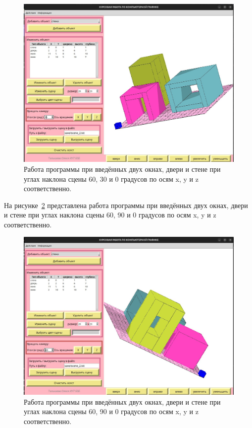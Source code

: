 \begin{figure}[H]
    \centering
    \includegraphics[width=1\textwidth]{img/example_60_30_0.png}
    \caption{Работа программы при введённых двух окнах, двери и стене при углах наклона сцены 60, 30 и 0 градусов по осям x, y и z соответственно.}
    \label{fig:example_60_30_0}
\end{figure}

На рисунке~\ref{fig:example_60_90_0} представлена работа программы при введённых двух окнах, двери и стене при углах наклона сцены 60, 90 и 0 градусов по осям x, y и z соответственно.

\begin{figure}[H]
    \centering
    \includegraphics[width=1\textwidth]{img/example_60_90_0.png}
    \caption{Работа программы при введённых двух окнах, двери и стене при углах наклона сцены 60, 90 и 0 градусов по осям x, y и z соответственно.}
    \label{fig:example_60_90_0}
\end{figure}


